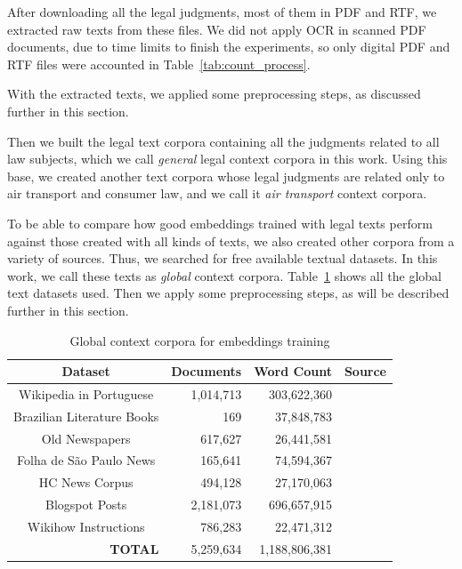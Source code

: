 After downloading all the legal judgments, most of them in \gls{PDF} and \gls{RTF}, we extracted raw texts from these files. We did not apply \gls{OCR} in scanned PDF documents, due to time limits to finish the experiments, so only digital \gls{PDF}  and \gls{RTF} files were accounted in Table~\ref{tab:count_process}. 

With the extracted texts, we applied some preprocessing steps, as discussed further in this section. 

Then we built the legal text corpora containing all the judgments related to all law subjects, which we call \emph{general} legal context corpora in this work. Using this base, we created another text corpora whose legal judgments are related only to air transport and consumer law, and we call it \emph{air transport} context corpora.

To be able to compare how good embeddings trained with legal texts perform against those created with all kinds of texts, we also created other corpora from a variety of sources. Thus, we searched for free available textual datasets. In this work, we call these texts as \emph{global} context corpora. Table~\ref{tab:global_corpora} shows all the global text datasets used. Then we apply some preprocessing steps, as will be described further in this section.

\begin{table}[htb]
\caption{Global context corpora for embeddings training}
\label{tab:global_corpora}
\centering
\footnotesize
\begin{tabular}{@{}crrc@{}}
\toprule
\textbf{Dataset}                   & \textbf{Documents} & \textbf{Word Count} & \textbf{Source} \\ \midrule
Wikipedia in Portuguese            & 1,014,713          & 303,622,360         & \textcite{Wikipedia2019}                \\
Brazilian Literature Books         & 169                & 37,848,783          & \textcite{Tatman2017}                 \\
Old Newspapers                     & 617,627            & 26,441,581          &         \textcite{Tan2020}     \\
Folha de São Paulo News            & 165,641            & 74,594,367          &                     \textcite{Marlessonn2019}             \\
HC News Corpus                     & 494,128            & 27,170,063          &        \textcite{Christensen2016}         \\
Blogspot Posts                     & 2,181,073          & 696,657,915         &          \textcite{Santos2018}       \\
Wikihow Instructions               & 786,283            & 22,471,312          &        \textcite{Chocron2018}         \\ \midrule
\multicolumn{1}{r}{\textbf{TOTAL}} & 5,259,634          & 1,188,806,381       & \textbf{}       \\ \bottomrule
\end{tabular}

\end{table}

